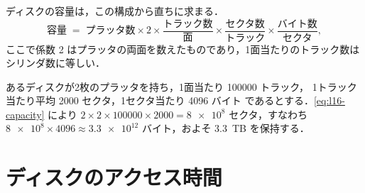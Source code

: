 \documentclass[../main.tex]{subfiles}
\begin{document}
ディスクの容量は，この構成から直ちに求まる．
\begin{equation}
  \text{容量} \;=\; \text{プラッタ数} \times 2
    \times \frac{\text{トラック数}}{\text{面}}
    \times \frac{\text{セクタ数}}{\text{トラック}}
    \times \frac{\text{バイト数}}{\text{セクタ}} ,
  \label{eq:l16-capacity}
\end{equation}
ここで係数 2 はプラッタの両面を数えたものであり，1面当たりのトラック数は
シリンダ数に等しい．

\begin{example}
  \label{ex:l16-capacity}
  あるディスクが2枚のプラッタを持ち，1面当たり \num{100000} トラック，
  1トラック当たり平均 \num{2000} セクタ，1セクタ当たり \num{4096} バイト
  であるとする．\cref{eq:l16-capacity} により $2\times 2\times
  \num{100000}\times \num{2000} = \num{8e8}$ セクタ，すなわち
  $\num{8e8}\times \num{4096} \approx \num{3.3e12}$ バイト，およそ
  3.3~TB を保持する．
\end{example}

\section{ディスクのアクセス時間}
\label{sec:l16-access}
\end{document}
